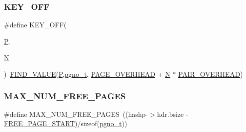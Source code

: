 \subsubsection{\texorpdfstring{KEY\_OFF}{KEY\_OFF}}
{\footnotesize\ttfamily \#define K\+E\+Y\+\_\+\+O\+FF(\begin{DoxyParamCaption}\item[{}]{\mbox{\hyperlink{adat__devel_2lib_2hadron_2operator__name__util_8cc_aef94be98e2c9e4a4dece75f60ca9792c}{P}},  }\item[{}]{\mbox{\hyperlink{adat__devel_2lib_2hadron_2operator__name__util_8cc_a7722c8ecbb62d99aee7ce68b1752f337}{N}} }\end{DoxyParamCaption})~\mbox{\hyperlink{adat__devel_2other__libs_2filedb_2filehash_2ffdb__page_8h_aac067124fe4d81f5306f4e2131e1121e}{F\+I\+N\+D\+\_\+\+V\+A\+L\+UE}}(\mbox{\hyperlink{adat__devel_2lib_2hadron_2operator__name__util_8cc_aef94be98e2c9e4a4dece75f60ca9792c}{P}},\mbox{\hyperlink{adat-devel_2other__libs_2filedb_2filehash_2ffdb__db_8h_a000813331643d38481142bcce7de1501}{pgno\+\_\+t}}, \mbox{\hyperlink{adat__devel_2other__libs_2filedb_2filehash_2ffdb__page_8h_a4be3c5b1517f8928d9819032d1ac4864}{P\+A\+G\+E\+\_\+\+O\+V\+E\+R\+H\+E\+AD}} + \mbox{\hyperlink{adat__devel_2lib_2hadron_2operator__name__util_8cc_a7722c8ecbb62d99aee7ce68b1752f337}{N}} $\ast$ \mbox{\hyperlink{adat__devel_2other__libs_2filedb_2filehash_2ffdb__page_8h_a1ac84ac56af664b2575aebd50f2c54bf}{P\+A\+I\+R\+\_\+\+O\+V\+E\+R\+H\+E\+AD}})}

\mbox{\label{adat-devel_2other__libs_2filedb_2filehash_2ffdb__page_8h_a9908728aefa1fbc19f141db91ed0b4af}} 
\subsubsection{\texorpdfstring{MAX\_NUM\_FREE\_PAGES}{MAX\_NUM\_FREE\_PAGES}}
{\footnotesize\ttfamily \#define M\+A\+X\+\_\+\+N\+U\+M\+\_\+\+F\+R\+E\+E\+\_\+\+P\+A\+G\+ES~((hashp-\/$>$hdr.\+bsize -\/ \mbox{\hyperlink{adat__devel_2other__libs_2filedb_2filehash_2ffdb__page_8h_aa30dfddda34c8c72638b8784cdf5bb57}{F\+R\+E\+E\+\_\+\+P\+A\+G\+E\+\_\+\+S\+T\+A\+RT}})/sizeof(\mbox{\hyperlink{adat-devel_2other__libs_2filedb_2filehash_2ffdb__db_8h_a000813331643d38481142bcce7de1501}{pgno\+\_\+t}}))}

